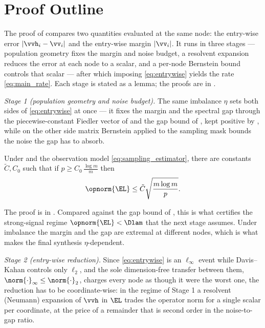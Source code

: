\section{Proof Outline}\label{sec:outline}
The proof of  compares two quantities evaluated at the same
node: the entry-wise error $|\vvh_i-\vv_i|$ and the entry-wise margin $|\vv_i|$.
It runs in three stages --- population geometry fixes the margin and noise
budget, a resolvent expansion reduces the error at each node to a scalar, and a
per-node Bernstein bound controls that scalar --- after which imposing
\eqref{eq:entrywise} yields the rate \eqref{eq:main_rate}. Each stage is stated
as a lemma; the proofs are in .

\emph{Stage 1 (population geometry and noise budget).} The same imbalance $\eta$
sets both sides of \eqref{eq:entrywise} at once --- it fixes the margin and the
spectral gap through the piecewise-constant Fiedler vector of
 and the gap bound of , kept positive by
, while on the other side matrix Bernstein applied to the
sampling mask bounds the noise the gap has to absorb.

\begin{lemma}\label{lem:B-bernstein}
Under  and the observation model
\eqref{eq:sampling_estimator}, there are constants $\tilde C,C_0$
such that if $p\ge C_0\,\tfrac{\log m}{m}$ then \hp
\[
   \opnorm{\EL}\le\tilde C\sqrt{\frac{m\log m}{p}}.
\]
\end{lemma}
\noindent The proof is in . Compared against the gap bound of
, this is what certifies the strong-signal regime
$\opnorm{\EL}<\Dlam$ that the next stage assumes. Under imbalance the margin and
the gap are extremal at different nodes, which is what makes the final synthesis
$\eta$-dependent.

\emph{Stage 2 (entry-wise reduction).} Since \eqref{eq:entrywise} is an
$\ell_\infty$ event while Davis--Kahan controls only $\ell_2$, and the sole
dimension-free transfer between them, $\norm{\cdot}_\infty\le\norm{\cdot}_2$,
charges every node as though it were the worst one, the reduction has to be
coordinate-wise: in the regime of Stage 1 a resolvent (Neumann) expansion of
$\vvh$ in $\EL$ trades the operator norm for a single scalar per coordinate, at
the price of a remainder that is second order in the noise-to-gap ratio.


